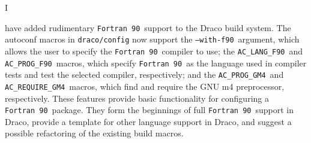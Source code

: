 \documentclass[11pt]{nmemo}
\newcommand{\fninety}{\texttt{Fortran~90}}
\newcommand{\withfninety}{\texttt{--with-f90}}
\newcommand{\langfninety}{\texttt{AC\_LANG\_F90}}
\newcommand{\progfninety}{\texttt{AC\_PROG\_F90}}
\newcommand{\requiregmfour}{\texttt{AC\_REQUIRE\_GM4}}
\newcommand{\proggmfour}{\texttt{AC\_PROG\_GM4}}
\begin{document}

\subject{\fninety\ Build Support in Draco}
\date{\today}




\opening


I have added rudimentary \fninety\ support to the Draco build
system\cite{draco-build}.  The autoconf\cite{autoconf} macros in
\texttt{draco/config} now support the \withfninety\ argument, which
allows the user to specify the \fninety\ compiler to use; the
\langfninety\ and \progfninety\ macros, which specify \fninety\ as the
language used in compiler tests and test the selected compiler,
respectively; and the \proggmfour\ and \requiregmfour\ macros, which
find and require the GNU m4\cite{m4} preprocessor, respectively.
These features provide basic functionality for configuring a \fninety\
package.  They form the beginnings of full \fninety\ support in Draco,
provide a template for other language support in Draco, and suggest a
possible refactoring of the existing build macros.
\end{document}
